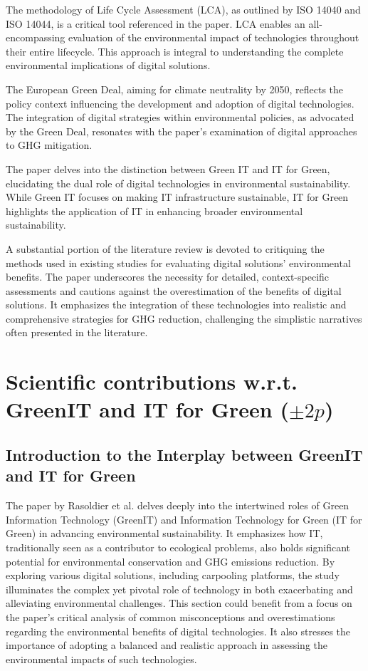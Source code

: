 \documentclass[conference,compsoc]{IEEEtran}
\begin{document}
The methodology of Life Cycle Assessment (LCA), as outlined by ISO 14040 and ISO 14044, is a critical tool referenced in the paper. LCA enables an all-encompassing evaluation of the environmental impact of technologies throughout their entire lifecycle. This approach is integral to understanding the complete environmental implications of digital solutions.

The European Green Deal, aiming for climate neutrality by 2050, reflects the policy context influencing the development and adoption of digital technologies. The integration of digital strategies within environmental policies, as advocated by the Green Deal, resonates with the paper's examination of digital approaches to GHG mitigation.

The paper delves into the distinction between Green IT and IT for Green, elucidating the dual role of digital technologies in environmental sustainability. While Green IT focuses on making IT infrastructure sustainable, IT for Green highlights the application of IT in enhancing broader environmental sustainability.

A substantial portion of the literature review is devoted to critiquing the methods used in existing studies for evaluating digital solutions' environmental benefits. The paper underscores the necessity for detailed, context-specific assessments and cautions against the overestimation of the benefits of digital solutions. It emphasizes the integration of these technologies into realistic and comprehensive strategies for GHG reduction, challenging the simplistic narratives often presented in the literature.

\section{Scientific contributions w.r.t. GreenIT and IT for Green ($\pm 2p$)}

\subsection{Introduction to the Interplay between GreenIT and IT for Green}

The paper by Rasoldier et al. delves deeply into the intertwined roles of Green Information Technology (GreenIT) and Information Technology for Green (IT for Green) in advancing environmental sustainability. It emphasizes how IT, traditionally seen as a contributor to ecological problems, also holds significant potential for environmental conservation and GHG emissions reduction. By exploring various digital solutions, including carpooling platforms, the study illuminates the complex yet pivotal role of technology in both exacerbating and alleviating environmental challenges. This section could benefit from a focus on the paper's critical analysis of common misconceptions and overestimations regarding the environmental benefits of digital technologies. It also stresses the importance of adopting a balanced and realistic approach in assessing the environmental impacts of such technologies.
\end{document}
